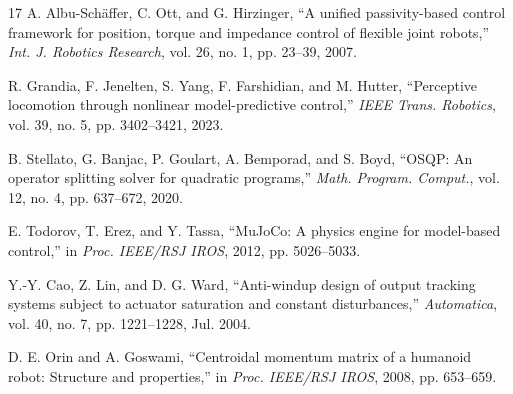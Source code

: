 \documentclass[journal]{IEEEtran}
\theoremstyle{plain}
\theoremstyle{definition}
\theoremstyle{remark}
\begin{document}
\begin{thebibliography}{17}
 A. Albu-Sch\"affer, C. Ott, and G. Hirzinger, ``A unified passivity-based control framework for position, torque and impedance control of flexible joint robots,'' \emph{Int. J. Robotics Research}, vol. 26, no. 1, pp. 23--39, 2007.

 R. Grandia, F. Jenelten, S. Yang, F. Farshidian, and M. Hutter, ``Perceptive locomotion through nonlinear model-predictive control,'' \emph{IEEE Trans. Robotics}, vol. 39, no. 5, pp. 3402--3421, 2023.

 B. Stellato, G. Banjac, P. Goulart, A. Bemporad, and S. Boyd, ``OSQP: An operator splitting solver for quadratic programs,'' \emph{Math. Program. Comput.}, vol. 12, no. 4, pp. 637--672, 2020.

 E. Todorov, T. Erez, and Y. Tassa, ``MuJoCo: A physics engine for model-based control,'' in \emph{Proc. IEEE/RSJ IROS}, 2012, pp. 5026--5033.

 Y.-Y. Cao, Z. Lin, and D. G. Ward, ``Anti-windup design of output tracking systems subject to actuator saturation and constant disturbances,'' \emph{Automatica}, vol. 40, no. 7, pp. 1221--1228, Jul. 2004.

 D. E. Orin and A. Goswami, ``Centroidal momentum matrix of a humanoid robot: Structure and properties,'' in \emph{Proc. IEEE/RSJ IROS}, 2008, pp. 653--659.

\end{thebibliography}
\end{document}
